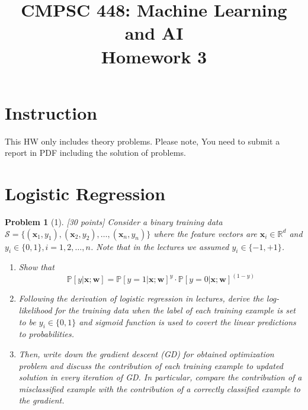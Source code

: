 \documentclass[11pt]{article}
\title{CMPSC 448: Machine Learning and AI \\ Homework 3}
\author{}
\date{}
\theoremstyle{quest}
\newtheorem*{problem}{Problem}
\begin{document}
\maketitle

\section*{Instruction}
This HW only includes theory problems. Please note, You need to submit a report in PDF including the solution of problems.

\section*{Logistic Regression}
\begin{problem}[1] [30 points]
Consider a binary training data $\mathcal{S} = \{(\bm{x}_{1}, y_1),(\bm{x}_{2}, y_2),\dots,(\bm{x}_{n}, y_n)\}$ where the feature vectors are $\bm{x}_{i} \in \mathbb{R}^{d} $ and $y_i \in \{0, 1\}, i=1,2,\dots,n$. Note that in the lectures we assumed $y_i \in \{-1, +1\}$.

\begin{enumerate}
    \item Show that
    \begin{equation}
        \mathbb{P}[y|\bm{x};\bm{w}] = \mathbb{P}[y=1|\bm{x};\bm{w}]^{y} \cdot \mathbb{P}[y=0|\bm{x};\bm{w}]^{(1-y)}
    \end{equation}
    \item Following the derivation of logistic regression in lectures, derive the log-likelihood for the training data when the label of each training example is set to be $y_i \in \{0, 1\}$ and sigmoid function is used to covert the linear predictions to probabilities.
    \item Then, write down the gradient descent (GD) for obtained optimization problem and discuss the contribution of each training example to updated solution in every iteration of GD. In particular, compare the contribution of a misclassified example with the contribution of a correctly classified example to the gradient.
\end{enumerate}

\end{problem}
\end{document}
